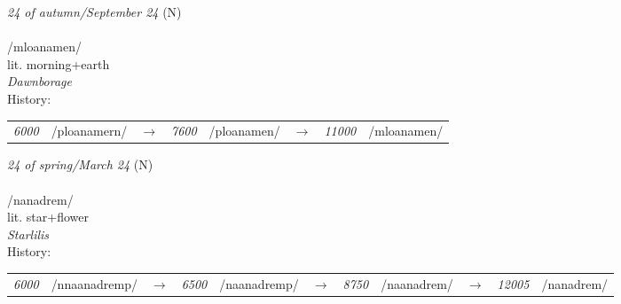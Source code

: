\vspace{15pt}
\begin{nopagebreak}
 \textit{24 of autumn/September 24} (N)\\
\\
\noindent /mloan{\textprimstress}amen/\\
\noindent lit. morning+earth\\
\noindent \textit{Dawnborage}\\


\noindent History:

\vspace{-0pt}
\hspace{40pt}
\begin{tabular}{ccc}
\textit{6000} & /ploanamern/&$\rightarrow$ & \textit{7600} & /ploanamen/&$\rightarrow$ & \textit{11000} & /mloanamen/& \\
\end{tabular}

\vspace{20pt}\hline

\end{nopagebreak}
\filbreak



\vspace{15pt}
\begin{nopagebreak}
 \textit{24 of spring/March 24} (N)\\
\\
\noindent /nan{\textprimstress}adrem/\\
\noindent lit. star+flower\\
\noindent \textit{Starlilis}\\


\noindent History:

\vspace{-0pt}
\hspace{40pt}
\begin{tabular}{ccc}
\textit{6000} & /nnaanadremp/&$\rightarrow$ & \textit{6500} & /naanadremp/&$\rightarrow$ & \textit{8750} & /naanadrem/&$\rightarrow$ & \textit{12005} & /nanadrem/& \\
\end{tabular}

\vspace{20pt}\hline

\end{nopagebreak}
\filbreak




